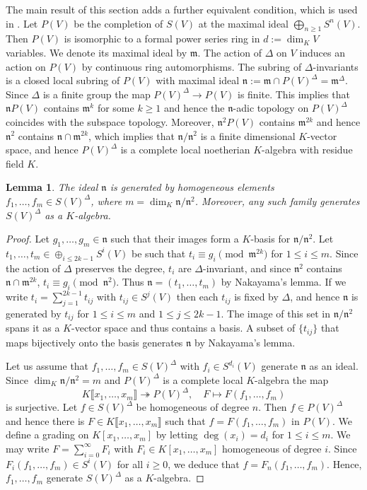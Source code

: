\documentclass{amsart}
\newtheorem{lem}[prop]{Lemma}
\theoremstyle{definition}
\theoremstyle{remark}
\newcommand{\mm}{\mathfrak m}
\newcommand{\nn}{\mathfrak n}
\newcommand{\br}[1]{\llbracket #1\rrbracket}
\begin{document}
The main result of this section 
  adds a further equivalent condition, which is used in .
Let $P(V)$ be the completion of $S(V)$ at the maximal ideal
$\bigoplus_{n\ge 1} S^n(V)$. Then $P(V)$ is isomorphic
to a formal power series ring in $d:=\dim_K V$ variables. We denote 
its maximal ideal by $\mm$.
The action of $\Delta$ on $V$ induces an action on $P(V)$ 
by continuous ring automorphisms. The subring of $\Delta$-invariants is a closed local subring of $P(V)$ with maximal ideal $\nn:=\mm \cap P(V)^{\Delta}= \mm^{\Delta}$. Since $\Delta$ is a finite group 
the map $P(V)^{\Delta}\rightarrow P(V)$ is finite. This implies that $\nn P(V)$ contains $\mm^k$ for some $k\ge 1$ and hence the $\nn$-adic topology on $P(V)^{\Delta}$ coincides with the subspace topology. Moreover, $\nn^2P(V)$ 
contains $\mm^{2k}$ and hence $\nn^2$ contains $\nn\cap \mm^{2k}$, which implies
that $\nn/\nn^2$ is a finite dimensional 
$K$-vector space, and hence $P(V)^{\Delta}$ is a complete  local  noetherian 
$K$-algebra with residue field $K$. 

\begin{lem}\label{grading} The ideal $\nn$ is generated by 
 homogeneous elements $f_1, \ldots, f_m \in S(V)^{\Delta}$, where $m=\dim_K \nn/\nn^2$.  Moreover, any such family generates
$S(V)^{\Delta}$ as a $K$-algebra.
\end{lem}
\begin{proof} Let $g_1, \ldots, g_m \in \nn$ 
such that their images form a $K$-basis for $\nn/\nn^2$. Let $t_1, \ldots, t_m\in \oplus_{i\le 2k-1} S^i(V)$ 
be such that   $t_i \equiv g_i \pmod{\mm^{2k}}$ for $1\le i \le m$. 
Since the action of $\Delta$ preserves the  degree, $t_i$ are $\Delta$-invariant, 
and since $\nn^2$ contains $\nn\cap \mm^{2k}$, 
$t_i\equiv g_i \pmod{\nn^2}$. Thus $\nn=(t_1, \ldots, t_m)$ by Nakayama's lemma. If we write $t_i=\sum_{j=1}^{2k-1}
t_{ij}$ with $t_{ij}\in S^j(V)$ then each $t_{ij}$ is fixed by $\Delta$, and hence
$\nn$ is generated by $t_{ij}$ for $1\le i\le m$ 
and $1\le j \le 2k-1$. The image of this set  
in $\nn/\nn^2$ spans it as a $K$-vector space
and thus contains a basis. A subset of $\{t_{ij}\}$ that maps bijectively onto the basis 
generates $\nn$ by Nakayama's lemma.

Let us assume that $f_1, \ldots, f_m \in S(V)^{\Delta}$ with $f_i\in S^{d_i}(V)$ generate $\nn$ as an ideal. 
Since $\dim_K \nn/\nn^2=m$ and $P(V)^{\Delta}$ is a complete local $K$-algebra the map 
\begin{equation}\label{mappy}
K\br{x_1,\ldots, x_m}\twoheadrightarrow P(V)^{\Delta}, \quad F\mapsto F(f_1,\ldots, f_m)
\end{equation}
is surjective. Let  $f\in S(V)^{\Delta}$ be homogeneous of degree $n$. Then 
$f\in P(V)^{\Delta}$ and hence there is $F\in K\br{x_1,\ldots, x_m}$ such that $f= F(f_1,\ldots, f_m)$ in $P(V)$. We define a grading on $K[x_1,\ldots, x_m]$ by letting 
$\deg(x_i)=d_i$ for $1\le i \le m$. 
We may write $F=\sum_{i=0}^{\infty} F_i$ with $F_i\in K[x_1,\ldots, x_m]$ homogeneous of degree $i$. Since $F_i(f_1,\ldots, f_m)\in S^i(V)$ for all $i\ge 0$, we deduce that $f=F_n(f_1,\ldots, f_m)$. Hence, $f_1, \ldots, f_m$ generate
$S(V)^{\Delta}$ as a $K$-algebra.
\end{proof}
\end{document}
